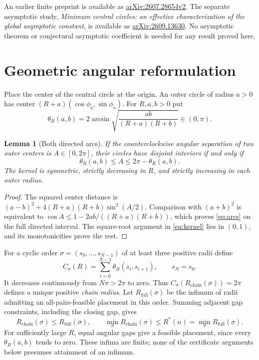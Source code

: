 \documentclass[11pt]{article}
\newtheorem{lemma}[theorem]{Lemma}
\theoremstyle{definition}
\theoremstyle{remark}
\newcommand{\Rchain}{R_{\mathrm{chain}}}
\newcommand{\Rfull}{R_{\mathrm{full}}}
\newcommand{\Rstar}{R^*}
\begin{document}
An earlier finite preprint is available as
\href{https://arxiv.org/abs/2607.28654}{arXiv:2607.28654v2}.
The separate asymptotic study,
\emph{Minimum central circles: an effective characterization of the global
asymptotic constant}, is available as
\href{https://arxiv.org/abs/2609.13630}{arXiv:2609.13630}.
No asymptotic theorem or conjectural asymptotic coefficient is needed for
any result proved here.

\section{Geometric angular reformulation}\label{sec:geometry}
Place the center of the central circle at the origin. An outer circle
of radius $a>0$
has center $(R+a)(\cos\phi_a,\sin\phi_a)$. For $R,a,b>0$ put
\begin{equation}\label{eq:kernel}
 \theta_R(a,b)=2\arcsin\sqrt{\frac{ab}{(R+a)(R+b)}}\in(0,\pi).
\end{equation}
\begin{lemma}[Both directed arcs]\label{lem:angular}
If the counterclockwise angular separation of two outer centers is
$A\in[0,2\pi]$, their circles have disjoint interiors if and only if
\begin{equation}\label{eq:arcs}
 \theta_R(a,b)\le A\le2\pi-\theta_R(a,b).
\end{equation}
The kernel is symmetric, strictly decreasing in $R$, and strictly increasing
in each outer radius.
\end{lemma}
\begin{proof}
The squared center distance is
$(a-b)^2+4(R+a)(R+b)\sin^2(A/2)$. Comparison with $(a+b)^2$
is equivalent to $\cos A\le1-2ab/((R+a)(R+b))$, which proves
\eqref{eq:arcs} on the full directed interval. The square-root argument in
\eqref{eq:kernel} lies in $(0,1)$, and its monotonicities prove the rest.
\end{proof}

For a cyclic order $\sigma=(s_0,\ldots,s_{N-1})$ of at least three
positive radii define
\[
 C_\sigma(R)=\sum_{i=0}^{N-1}\theta_R(s_i,s_{i+1}),\qquad s_N=s_0.
\]
It decreases continuously from $N\pi>2\pi$ to zero. Thus
$C_\sigma(\Rchain(\sigma))=2\pi$ defines a unique positive
\emph{chain radius}. Let $\Rfull(\sigma)$ be the infimum of radii
admitting an all-pairs-feasible placement in this order. Summing adjacent
gap constraints, including the closing gap, gives
\begin{equation}\label{eq:hierarchy}
 \Rchain(\sigma)\le\Rfull(\sigma),\qquad
 \min_\sigma\Rchain(\sigma)\le\Rstar(n)=\min_\sigma\Rfull(\sigma).
\end{equation}
For sufficiently large $R$, equal angular gaps give a feasible placement,
since every $\theta_R(a,b)$ tends to zero. These infima are finite; none
of the certificate arguments below presumes attainment of an infimum.
\end{document}
